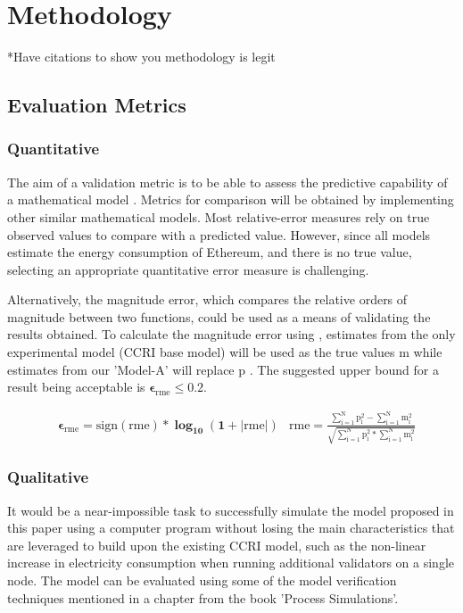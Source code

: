 \chapter {Methodology}
*Have citations to show you methodology is legit

\section {Evaluation Metrics}

\subsection{Quantitative}
\label{MethoologyErrorQuant}
The aim of a validation metric is to be able to assess the predictive capability of a mathematical model \cite{Kat2012ValidationError}. Metrics for comparison will be obtained by implementing other similar mathematical models. Most relative-error measures rely on true observed values to compare with a predicted value. However, since all models estimate the energy consumption of Ethereum, and there is no true value, selecting an appropriate quantitative error measure is challenging. 

Alternatively, the magnitude error, which compares the relative orders of magnitude between two functions, could be used as a means of validating the results obtained. To calculate the magnitude error using , estimates from the only experimental model (CCRI base model) will be used as the true values $\boldsymbol{\mathrm{m}}$ while estimates from our 'Model-A' will replace $\boldsymbol{\mathrm{p}}$ \cite{RussellErrorMeasure}. The suggested upper bound for a result being acceptable is $\boldsymbol{\epsilon_\mathrm{rme} \leq 0.2}$.

\begin{align}
\label{eqn:ErrorMeasureEqn}
    &\boldsymbol{\epsilon_\mathrm{rme} = \mathrm{sign(rme)} * \log_{10} (1 + |\mathrm{rme}|)}
    &\boldsymbol{ \mathrm{rme} = \mathrm{\frac{\mathrm{\sum\limits_{i=1}^{N} p_{i}^{2}} - \mathrm{\sum\limits_{i=1}^{N} m_{i}^{2}}}{\sqrt{\mathrm{\sum\limits_{i=1}^{N} p_{i}^{2}} * \mathrm{\sum\limits_{i=1}^{N} m_{i}^{2}}}}}}
\end{align}

\subsection{Qualitative}
\label{QualModelEvalMEthodology}
 It would be a near-impossible task to successfully simulate the model proposed in this paper using a computer program without losing the main characteristics that are leveraged to build upon the existing CCRI model, such as the non-linear increase in electricity consumption when running additional validators on a single node. The model can be evaluated using some of the model verification techniques mentioned in a chapter \cite{Al-Aomar2015ModelTechniques} from the book 'Process Simulations'.

